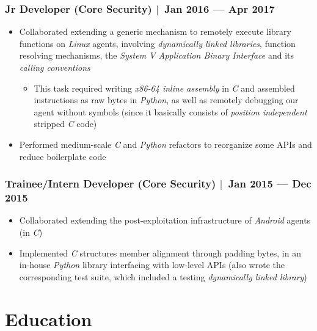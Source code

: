 \documentclass[12pt, a4paper]{article}
\newcommand{\mysep}{{\Large $\mid$}\ }
\newcommand{\python}{\emph{Python}}
\newcommand{\cc}{\emph{C}}
\begin{document}
    \subsubsection*{Jr Developer (Core Security) \mysep Jan 2016 --- Apr 2017}
    \begin{itemize}
        \item Collaborated extending a generic mechanism
        to remotely execute library functions on \emph{Linux} agents,
        involving \emph{dynamically linked libraries}, function resolving mechanisms,
        the \emph{System V Application Binary Interface} and its \emph{calling conventions}
        \begin{itemize}
            \item This task required writing \emph{x86-64 inline assembly} in \cc{}
            and assembled instructions as raw bytes in \python{},
            as well as remotely debugging our agent without symbols
            (since it basically consists of \emph{position independent} stripped \cc{} code)
        \end{itemize}
        \item Performed medium-scale \cc{} and \python{} refactors to reorganize some APIs
        and reduce boilerplate code
    \end{itemize}

    \subsubsection*{Trainee/Intern Developer (Core Security) \mysep Jan 2015 --- Dec 2015}
    \begin{itemize}
        \item Collaborated extending the post-exploitation infrastructure of \emph{Android} agents (in \cc{})
        \item Implemented \cc{} structures member alignment through padding bytes,
        in an in-house \python{} library interfacing with low-level APIs
        (also wrote the corresponding test suite, which included a testing \emph{dynamically linked library})
    \end{itemize}


    \section*{Education} \label{sec:education}
\end{document}
